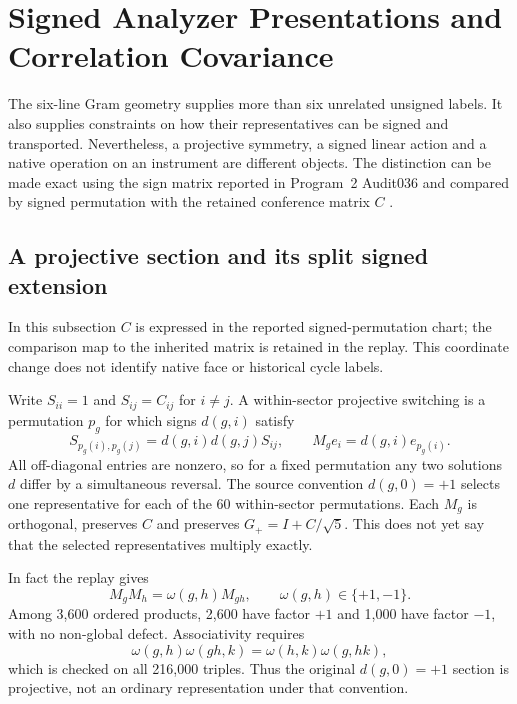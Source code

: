 \begingroup
\renewcommand{\thesection}{27A}
\section{Signed Analyzer Presentations and Correlation Covariance}\label{sec:signedaxisreference}
The six-line Gram geometry supplies more than six unrelated unsigned labels. It also supplies constraints on how their representatives can be signed and transported. Nevertheless, a projective symmetry, a signed linear action and a native operation on an instrument are different objects. The distinction can be made exact using the sign matrix reported in Program~2 Audit036 and compared by signed permutation with the retained conference matrix $C$ \citep{cave2026p4receipts,cave2026draft6replays}.

\subsection*{A projective section and its split signed extension}
In this subsection $C$ is expressed in the reported signed-permutation chart; the comparison map to the inherited matrix is retained in the replay. This coordinate change does not identify native face or historical cycle labels.

Write $S_{ii}=1$ and $S_{ij}=C_{ij}$ for $i\ne j$. A within-sector projective switching is a permutation $p_g$ for which signs $d(g,i)$ satisfy
\begin{equation}
S_{p_g(i),p_g(j)}=d(g,i)d(g,j)S_{ij},\qquad
M_g e_i=d(g,i)e_{p_g(i)}.
\tag{SA1}\label{eq:signedswitching}
\end{equation}
All off-diagonal entries are nonzero, so for a fixed permutation any two solutions $d$ differ by a simultaneous reversal. The source convention $d(g,0)=+1$ selects one representative for each of the 60 within-sector permutations. Each $M_g$ is orthogonal, preserves $C$ and preserves $G_+=I+C/\sqrt5$. This does not yet say that the selected representatives multiply exactly.

In fact the replay gives
\begin{equation}
M_gM_h=\omega(g,h)M_{gh},\qquad
\omega(g,h)\in\{+1,-1\}.
\tag{SA2}\label{eq:switchingfactor}
\end{equation}
Among 3,600 ordered products, 2,600 have factor $+1$ and 1,000 have factor $-1$, with no non-global defect. Associativity requires
\[
\omega(g,h)\omega(gh,k)=\omega(h,k)\omega(g,hk),
\]
which is checked on all 216,000 triples. Thus the original $d(g,0)=+1$ section is projective, not an ordinary representation under that convention.

